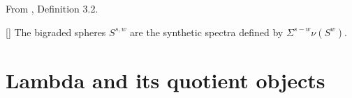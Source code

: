 \begin{definition}
\label{paper:3.2}
From \cite{LWX126}, Definition 3.2.\par

[{\cite[Definition 4.6]{Pst}}]
The bigraded spheres $S^{s,w}$ are the synthetic spectra defined by $\Sigma^{s-w}\nu (S^w)$.




\sketch
\end{definition}

\section{Lambda and its quotient objects}


